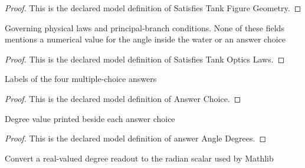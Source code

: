 \begin{proof}
  This is the declared model definition of Satisfies Tank Figure Geometry.
\end{proof}
\begin{definition}
  \label{def:physics:phyx-mini-0103:phyxminiproblems-problemphyxmini0103-satisfiestankopticslaws}
  Governing physical laws and principal-branch conditions. None of these fields mentions a numerical value for the angle inside the water or an answer choice
\end{definition}
\begin{proof}
  This is the declared model definition of Satisfies Tank Optics Laws.
\end{proof}
\begin{definition}
  \label{def:physics:phyx-mini-0103:phyxminiproblems-problemphyxmini0103-answerchoice}
  Labels of the four multiple-choice answers
\end{definition}
\begin{proof}
  This is the declared model definition of Answer Choice.
\end{proof}
\begin{definition}
  \label{def:physics:phyx-mini-0103:phyxminiproblems-problemphyxmini0103-answerangledegrees}
  Degree value printed beside each answer choice
\end{definition}
\begin{proof}
  This is the declared model definition of answer Angle Degrees.
\end{proof}
\begin{definition}
  \label{def:physics:phyx-mini-0103:phyxminiproblems-problemphyxmini0103-degreestoradians}
  Convert a real-valued degree readout to the radian scalar used by Mathlib
\end{definition}
